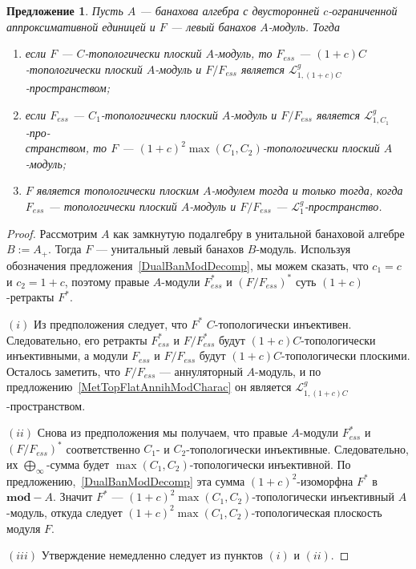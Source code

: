 \documentclass[12pt]{article}
\newtheorem{proposition}[theorem]{Предложение}
\begin{document}
\begin{proposition}\label{TopFlatModCharac} Пусть $A$ --- банахова алгебра с
двусторонней $c$-ограниченной аппроксимативной единицей и $F$ --- левый банахов
$A$-модуль. Тогда
\begin{enumerate}[label = (\roman*)]
\item если $F$ --- $C$-топологически плоский $A$-модуль, то $F_{ess}$ ---
$(1+c)C$-топологически плоский $A$-модуль и $F/F_{ess}$ является
$\mathcal{L}_{1,(1+c)C}^g$-пространством;
\item если $F_{ess}$ --- $C_1$-топологически плоский $A$-модуль и $F/F_{ess}$
является $\mathcal{L}_{1,C_1}^g$-про-\\странством, то $F$ ---
${(1+c)}^2\max(C_1, C_2)$-топологически плоский $A$-модуль;
\item $F$ является топологически плоским $A$-модулем тогда и только тогда, когда
$F_{ess}$  --- топологически плоский $A$-модуль и $F/F_{ess}$ ---
$\mathcal{L}_1^g$-пространство.
\end{enumerate}
\end{proposition}
\begin{proof} Рассмотрим $A$ как замкнутую подалгебру в унитальной банаховой
алгебре $B:=A_+$. Тогда $F$ --- унитальный левый банахов $B$-модуль. Используя
обозначения предложения~\ref{DualBanModDecomp}, мы можем сказать, что $c_1=c$ и
$c_2=1+c$, поэтому правые $A$-модули $F_{ess}^*$ и ${(F/F_{ess})}^*$ суть
$(1+c)$-ретракты $F^*$.

$(i)$ Из предположения следует, что $F^*$ $C$-топологически инъективен.
Следовательно, его ретракты $F_{ess}^*$ и $F/F_{ess}^*$ будут
$(1+c)C$-топологически инъективными, а модули $F_{ess}$ и $F/F_{ess}$ будут
$(1+c)C$-топологически плоскими. Осталось заметить, что $F/F_{ess}$ ---
аннуляторный $A$-модуль, и по предложению~\ref{MetTopFlatAnnihModCharac} он
является $\mathcal{L}_{1,(1+c)C}^g$-пространством.

$(ii)$ Снова из предположения мы получаем, что правые $A$-модули $F_{ess}^*$ и
${(F/F_{ess})}^*$ соответственно $C_1$- и $C_2$-топологически инъективные.
Следовательно, их $\bigoplus_\infty$-сумма будет $\max(C_1,C_2)$-топологически
инъективной. По предложению,~\ref{DualBanModDecomp} эта сумма
${(1+c)}^2$-изоморфна $F^*$ в $\mathbf{mod}-A$. Значит $F^*$ ---
${(1+c)}^2\max(C_1, C_2)$-топологически инъективный $A$-модуль, откуда следует
${(1+c)}^2\max(C_1, C_2)$-топологическая плоскость модуля $F$.

$(iii)$ Утверждение немедленно следует из пунктов $(i)$ и $(ii)$.
\end{proof}
\end{document}
